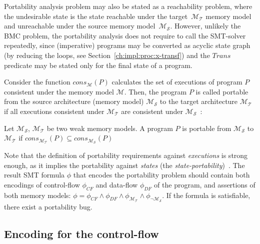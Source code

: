Portability analysis problem may also be stated as a reachability problem, where the undesirable state is the state reachable under the target~$\mathcal{M_T}$ memory model and unreachable under the source memory model~$\mathcal{M_S}$. However, unlikely the BMC problem, the portability analysis does not require to call the SMT-solver repeatedly, since (imperative) programs may be converted as acyclic state graph (by reducing the loops, see Section~\ref{ch:impl:proc:x-transf}) and the $Trans$ predicate may be stated only for the final state of a program.

Consider the function $cons_{\mathcal{M}}(P)$ calculates the set of executions of program $P$ consistent under the memory model $\mathcal{M}$. Then, the program $P$ is called portable from the source architecture (memory model) $\mathcal{M_S}$ to the target architecture $\mathcal{M_T}$ if all executions consistent under $\mathcal{M_T}$ are consistent under $\mathcal{M_S}$~\cite{Porthos17SAS}:

\begin{definition}[Portability]
Let $\mathcal{M_S}$, $\mathcal{M_T}$ be two weak memory models. A program $P$ is portable from $\mathcal{M_S}$ to $\mathcal{M_T}$ if 
$cons_{\mathcal{M_T}}(P) \subseteq cons_{\mathcal{M_S}}(P)$
\end{definition}

Note that the definition of portability requirements against \textit{executions} is strong enough, as it implies the portability against \textit{states} (the \textit{state-portability})~\cite{Porthos17CoRR}.
The result SMT formula $\phi$ that encodes the portability problem should contain both encodings of control-flow $\phi_{CF}$ and data-flow $\phi_{DF}$ of the program, and assertions of both memory models: ${\phi = \phi_{CF} \land \phi_{DF} \land \phi_{\mathcal{M_T}} \land \phi_{\lnot\mathcal{M_S}}}$. If the formula is satisfiable, there exist a portability bug.


\subsection{Encoding for the control-flow} %
\label{ch:port:enc:cf}

